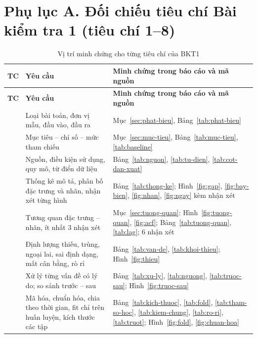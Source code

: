 \documentclass[../main.tex]{subfiles}
\begin{document}
\section*{Phụ lục A. Đối chiếu tiêu chí Bài kiểm tra 1 (tiêu chí 1--8)}

\begin{longtable}{|>{\raggedright\arraybackslash}p{0.9cm}|>{\raggedright\arraybackslash}p{5.2cm}|>{\raggedright\arraybackslash}p{8.3cm}|}
\caption{Vị trí minh chứng cho từng tiêu chí của BKT1}
\label{tab:doi-chieu}\\
\hline
\textbf{TC} & \textbf{Yêu cầu} & \textbf{Minh chứng trong báo cáo và mã nguồn} \\
\hline
\endfirsthead
\hline
\textbf{TC} & \textbf{Yêu cầu} & \textbf{Minh chứng trong báo cáo và mã nguồn} \\
\hline
\endhead
1 & Loại bài toán, đơn vị mẫu, đầu vào, đầu ra & Mục~\ref{sec:phat-bieu}, Bảng~\ref{tab:phat-bieu} \\
\hline
2 & Mục tiêu -- chỉ số -- mức tham chiếu & Mục~\ref{sec:muc-tieu}, Bảng~\ref{tab:muc-tieu}, \ref{tab:baseline} \\
\hline
3 & Nguồn, điều kiện sử dụng, quy mô, từ điển dữ liệu & Bảng~\ref{tab:nguon}, \ref{tab:tu-dien}, \ref{tab:cot-dan-xuat} \\
\hline
4 & Thống kê mô tả, phân bố đặc trưng và nhãn, nhận xét từng hình & Bảng~\ref{tab:thong-ke}; Hình~\ref{fig:gap}, \ref{fig:bay-bien}, \ref{fig:nhan}, \ref{fig:ngay} kèm nhận xét \\
\hline
5 & Tương quan đặc trưng -- nhãn, ít nhất 3 nhận xét & Mục~\ref{sec:tuong-quan}: Hình~\ref{fig:tuong-quan}, \ref{fig:acf}; Bảng~\ref{tab:tuong-quan}, \ref{tab:lag}; 6 nhận xét \\
\hline
6 & Định lượng thiếu, trùng, ngoại lai, sai định dạng, mất cân bằng, rò rỉ & Bảng~\ref{tab:van-de}, \ref{tab:khoi-thieu}; Hình~\ref{fig:thieu} \\
\hline
7 & Xử lý từng vấn đề có lý do; so sánh trước -- sau & Bảng~\ref{tab:xu-ly}, \ref{tab:nguong}, \ref{tab:truoc-sau}; Hình~\ref{fig:truoc-sau} \\
\hline
8 & Mã hóa, chuẩn hóa, chia theo thời gian, fit chỉ trên huấn luyện, kích thước các tập & Bảng~\ref{tab:kich-thuoc}, \ref{tab:fold}, \ref{tab:tham-so-hoc}, \ref{tab:kiem-chung}, \ref{tab:ro-ri}, \ref{tab:truot}; Hình~\ref{fig:fold}, \ref{fig:chuan-hoa} \\
\hline
\end{longtable}
\end{document}
